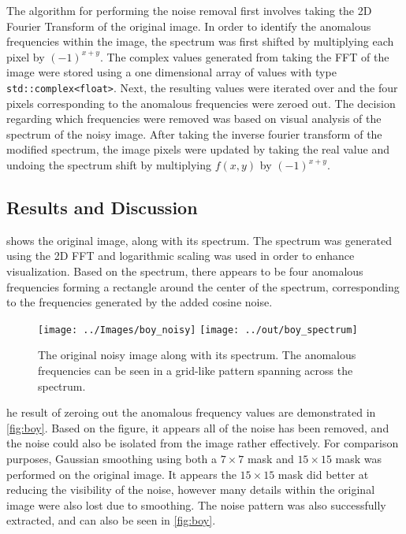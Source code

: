 \documentclass[headings=optiontoheadandtoc,listof=totoc,parskip=full]{scrartcl}
\begin{document}
The algorithm for performing the noise removal first involves taking the 2D Fourier Transform of the original image. In order to identify the anomalous frequencies within the image, the spectrum was first shifted by multiplying each pixel by \((-1)^{x + y}\). The complex values generated from taking the FFT of the image were stored using a one dimensional array of values with type \texttt{std::complex<float>}. Next, the resulting values were iterated over and the four pixels corresponding to the anomalous frequencies were zeroed out. The decision regarding which frequencies were removed was based on visual analysis of the spectrum of the noisy image. After taking the inverse fourier transform of the modified spectrum, the image pixels were updated by taking the real value and undoing the spectrum shift by multiplying $f(x,y)$ by \((-1)^{x + y}\).

\subsection{Results and Discussion}

 shows the original image, along with its spectrum. The spectrum was generated using the 2D FFT and logarithmic scaling was used in order to enhance visualization. Based on the spectrum, there appears to be four anomalous frequencies forming a rectangle around the center of the spectrum, corresponding to the frequencies generated by the added cosine noise. 

\begin{figure}[H]
	\centering
	\texttt{[image: ../Images/boy\_noisy]}
	\quad
	\texttt{[image: ../out/boy\_spectrum]}
	\caption{The original noisy image along with its spectrum. The anomalous frequencies can be seen in a grid-like pattern spanning across the spectrum.}
	\label{fig:boyNoisy}
\end{figure}

he result of zeroing out the anomalous frequency values are demonstrated in \cref{fig:boy}. Based on the figure, it appears all of the noise has been removed, and the noise could also be isolated from the image rather effectively. For comparison purposes, Gaussian smoothing using both a $7 \times 7$ mask and $15 \times 15$ mask was performed on the original image. It appears the $15 \times 15$ mask did better at reducing the visibility of the noise, however many details within the original image were also lost due to smoothing. The noise pattern was also successfully extracted, and can also be seen in \cref{fig:boy}.
\end{document}
